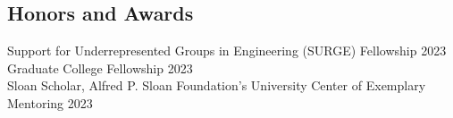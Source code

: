 \documentclass[margin,line]{res}
\newenvironment{list1}{
  \begin{list}{\ding{113}}{%
      \setlength{\itemsep}{0in}
      \setlength{\parsep}{0in} \setlength{\parskip}{0in}
      \setlength{\topsep}{0in} \setlength{\partopsep}{0in} 
      \setlength{\leftmargin}{0.17in}}}{\end{list}}
\begin{document}
\begin{resume}






  \section{\sc Honors and Awards}

  Support for Underrepresented Groups in Engineering (SURGE) Fellowship \hfill 2023 \\
  Graduate College Fellowship \hfill 2023 \\
  Sloan Scholar, Alfred P. Sloan Foundation’s University Center of Exemplary Mentoring \hfill 2023 \\


\end{resume}
\end{document}
